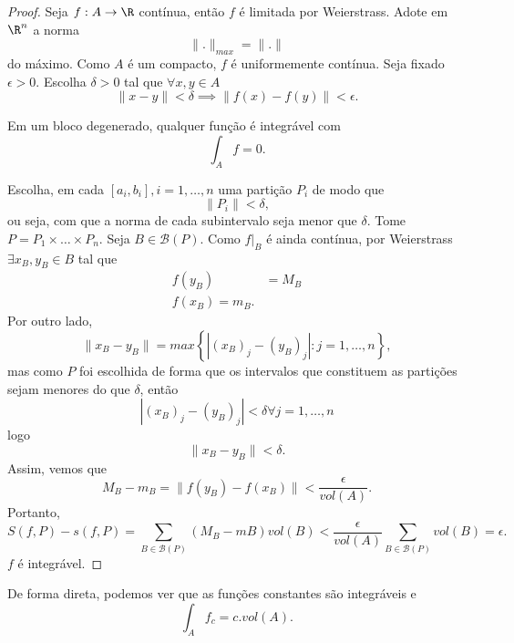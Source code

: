 \begin{proof}
    Seja $f:A\to \R$ contínua, então $f$ é limitada por Weierstrass. Adote em $\R^{n}$ a norma \[
    \|.\|_{max} = \|.\|
    \] do máximo.
    Como $A$ é um compacto, $f$ é uniformemente contínua.
    Seja fixado $\epsilon > 0$. Escolha $\delta > 0$ tal que $\forall x,y \in A$ \[
	\|x-y\|<\delta \implies \|f\left( x \right) -f\left( y \right) \|<\epsilon
    .\] 
    \begin{observe}
        Em um bloco degenerado, qualquer função é integrável com \[
        \int_A f = 0
        .\] 
    \end{observe}
    Escolha, em cada $\left[ a_i,b_i \right], i=1,\ldots,n $ uma partição $P_i$ de modo que \[
    \|P_i\| < \delta
    ,\] ou seja, com que a norma de cada subintervalo seja menor que $\delta$. Tome $P = P_1\times \ldots\times P_n$. Seja $B \in \mathcal{B}\left( P \right) $. Como $f|_B$ é ainda contínua, por Weierstrass $\exists x_B,y_B\in B$ tal que
    \begin{align*}
	f\left( y_B \right) &= M_B \\
	f\left( x_B \right) = m_B
    .\end{align*}
    Por outro lado, \[
    \|x_B - y_B\| = max\left\{ |\left( x_B \right)_j - \left( y_B \right)_j | : j = 1,\ldots,n \right\} 
    ,\] mas como $P$ foi escolhida de forma que os intervalos que constituem as partições sejam menores do que $\delta$, então \[
    |\left( x_B \right)_j - \left( y_B \right)_j | < \delta \forall j=1,\ldots,n
    \] logo \[
    \|x_B - y_B\| < \delta
    .\] Assim, vemos que \[
    M_B - m_B = \|f\left( y_B \right) -f\left( x_B \right) \|< \frac{\epsilon}{vol\left( A \right) }
    .\] Portanto, \[
    S\left( f, P \right) - s\left( f, P \right) = \sum_{B\in \mathcal{B}\left( P \right) } \left( M_B - mB \right) vol\left( B \right) <\frac{\epsilon}{vol\left( A \right) } \sum_{B\in \mathcal{B}\left( P \right) } vol\left( B \right) = \epsilon
    .\] $f$ é integrável.
\end{proof}

De forma direta, podemos ver que as funções constantes são integráveis e \[
\int_A f_c = c . vol\left( A \right) 
.\] 


